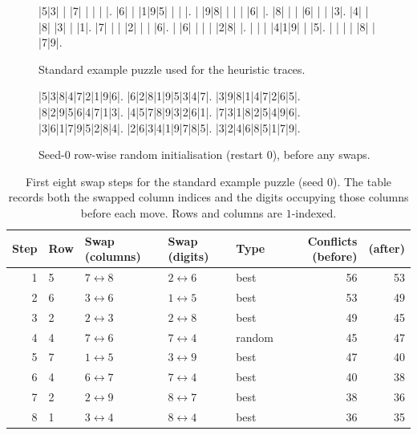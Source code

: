 \documentclass[11pt]{article}
\newcommand{\papersudokustyle}{%
    \setlength{\sudokusize}{6.2cm}%
    \setlength{\sudokuthinline}{0.8pt}%
    \setlength{\sudokuthickline}{2.8pt}%
    \renewcommand*\sudokuformat[1]{\Large\sffamily ##1}%
}
\begin{document}
\begin{figure}[t]
\centering
{\papersudokustyle
\begin{sudoku-block}
|5|3| | |7| | | | |.
|6| | |1|9|5| | | |.
| |9|8| | | | |6| |.
|8| | | |6| | | |3|.
|4| | |8| |3| | |1|.
|7| | | |2| | | |6|.
| |6| | | | |2|8| |.
| | | |4|1|9| | |5|.
| | | | |8| | |7|9|.
\end{sudoku-block}}
\caption{Standard example puzzle used for the heuristic traces.}
\label{fig:example-puzzle}
\end{figure}

\begin{figure}[t]
\centering
{\papersudokustyle
\begin{sudoku-block}
|5|3|8|4|7|2|1|9|6|.
|6|2|8|1|9|5|3|4|7|.
|3|9|8|1|4|7|2|6|5|.
|8|2|9|5|6|4|7|1|3|.
|4|5|7|8|9|3|2|6|1|.
|7|3|1|8|2|5|4|9|6|.
|3|6|1|7|9|5|2|8|4|.
|2|6|3|4|1|9|7|8|5|.
|3|2|4|6|8|5|1|7|9|.
\end{sudoku-block}}
\caption{Seed-\(0\) row-wise random initialisation (restart \(0\)), before any swaps.}
\label{fig:seed-zero-init}
\end{figure}

\begin{table}[t]
\centering
\small
\begin{tabular}{@{}rllllrr@{}}
\toprule
Step & Row & Swap (columns) & Swap (digits) & Type & Conflicts (before) & (after) \\
\midrule
1 & 5 & $7\leftrightarrow 8$ & $2\leftrightarrow 6$ & best   & 56 & 53 \\
2 & 6 & $3\leftrightarrow 6$ & $1\leftrightarrow 5$ & best   & 53 & 49 \\
3 & 2 & $2\leftrightarrow 3$ & $2\leftrightarrow 8$ & best   & 49 & 45 \\
4 & 4 & $7\leftrightarrow 6$ & $7\leftrightarrow 4$ & random & 45 & 47 \\
5 & 7 & $1\leftrightarrow 5$ & $3\leftrightarrow 9$ & best   & 47 & 40 \\
6 & 4 & $6\leftrightarrow 7$ & $7\leftrightarrow 4$ & best   & 40 & 38 \\
7 & 2 & $2\leftrightarrow 9$ & $8\leftrightarrow 7$ & best   & 38 & 36 \\
8 & 1 & $3\leftrightarrow 4$ & $8\leftrightarrow 4$ & best   & 36 & 35 \\
\bottomrule
\end{tabular}
\caption{First eight swap steps for the standard example puzzle (seed \(0\)). The table records both the swapped column indices and the digits occupying those columns before each move. Rows and columns are \(1\)-indexed.}
\label{tab:trace-stepwise}
\end{table}
\end{document}
